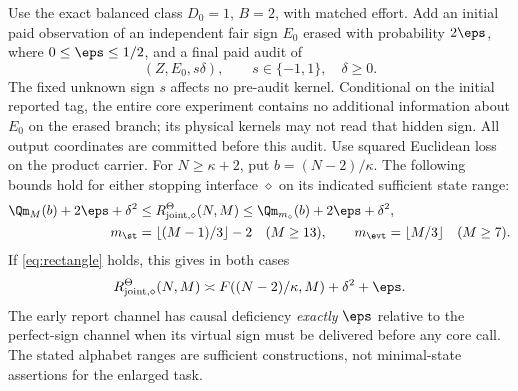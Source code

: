 \begin{theorem}\label{thm:joint}
Use the exact balanced class $D_0=1$, $B=2$, with matched effort. Add an initial paid observation of an independent fair sign $E_0$ erased with probability $2\eps$, where $0\le\eps\le1/2$, and a final paid audit of
\[
 (Z,E_0,s\delta),\qquad s\in\{-1,1\},\quad\delta\ge0.
\]
The fixed unknown sign $s$ affects no pre-audit kernel. Conditional on the initial reported tag, the entire core experiment contains no additional information about $E_0$ on the erased branch; its physical kernels may not read that hidden sign. All output coordinates are committed before this audit. Use squared Euclidean loss on the product carrier. For $N\ge\kappa+2$, put $b=(N-2)/\kappa$. The following bounds hold for either stopping interface $\diamond$ on its indicated sufficient state range:
\begin{align}
 \Qm_M(b)+2\eps+\delta^2
 &\le R_{{\rm joint},\diamond}^\Theta(N,M)
 \le\Qm_{m_\diamond}(b)+2\eps+\delta^2,\label{eq:joint-bounds}\\
 m_\st&=\lfloor(M-1)/3\rfloor-2\quad(M\ge13),\qquad
 m_\evt=\lfloor M/3\rfloor\quad(M\ge7).\label{eq:joint-widths}
\end{align}
If \eqref{eq:rectangle} holds, this gives in both cases
\begin{equation}\label{eq:joint-rate}
 R_{{\rm joint},\diamond}^\Theta(N,M)
 \asymp F((N-2)/\kappa,M)+\delta^2+\eps.
\end{equation}
The early report channel has causal deficiency \emph{exactly} $\eps$ relative to the perfect-sign channel when its virtual sign must be delivered before any core call. The stated alphabet ranges are sufficient constructions, not minimal-state assertions for the enlarged task.
\end{theorem}
